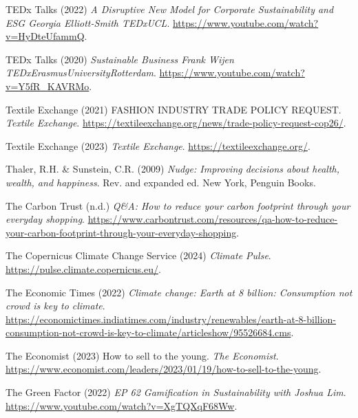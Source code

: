 \documentclass[
  letterpaper,
  DIV=11,
  numbers=noendperiod]{scrartcl}
\newlength{\cslhangindent}
\newenvironment{CSLReferences}[2] %
 {\begin{list}{}{%
  \setlength{\itemindent}{0pt}
  \setlength{\leftmargin}{0pt}
  \setlength{\parsep}{0pt}
  \ifodd #1
   \setlength{\leftmargin}{\cslhangindent}
   \setlength{\itemindent}{-1\cslhangindent}
  \fi
  \setlength{\itemsep}{#2\baselineskip}}}
 {\end{list}}
\begin{document}
\begin{CSLReferences}{0}{1}
TEDx Talks (2022) \emph{A {Disruptive New Model} for {Corporate
Sustainability} and {ESG} {\textbar} {Georgia Elliott-Smith} {\textbar}
{TEDxUCL}}. \url{https://www.youtube.com/watch?v=HyDteUfammQ}.

TEDx Talks (2020) \emph{Sustainable {Business} {\textbar} {Frank Wijen}
{\textbar} {TEDxErasmusUniversityRotterdam}}.
\url{https://www.youtube.com/watch?v=Y5fR_KAVRMo}.

Textile Exchange (2021) {FASHION INDUSTRY TRADE POLICY REQUEST}.
\emph{Textile Exchange}.
\url{https://textileexchange.org/news/trade-policy-request-cop26/}.

Textile Exchange (2023) \emph{Textile {Exchange}}.
\url{https://textileexchange.org/}.

Thaler, R.H. \& Sunstein, C.R. (2009) \emph{Nudge: Improving decisions
about health, wealth, and happiness}. Rev. and expanded ed. New York,
Penguin Books.

The Carbon Trust (n.d.) \emph{Q\&{A}: {How} to reduce your carbon
footprint through your everyday shopping}.
\url{https://www.carbontrust.com/resources/qa-how-to-reduce-your-carbon-footprint-through-your-everyday-shopping}.

The Copernicus Climate Change Service (2024) \emph{Climate {Pulse}}.
\url{https://pulse.climate.copernicus.eu/}.

The Economic Times (2022) \emph{Climate change: {Earth} at 8 billion:
{Consumption} not crowd is key to climate}.
\url{https://economictimes.indiatimes.com/industry/renewables/earth-at-8-billion-consumption-not-crowd-is-key-to-climate/articleshow/95526684.cms}.

The Economist (2023) How to sell to the young. \emph{The Economist}.
\url{https://www.economist.com/leaders/2023/01/19/how-to-sell-to-the-young}.

The Green Factor (2022) \emph{{EP} 62 {Gamification} in {Sustainability}
with {Joshua Lim}}. \url{https://www.youtube.com/watch?v=XgTQXqF68Ww}.


\end{CSLReferences}
\end{document}
